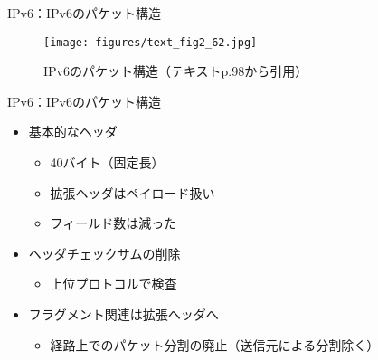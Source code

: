 \documentclass[12pt,aspectratio=169]{beamer}
\begin{document}
\begin{frame}{IPv6：IPv6のパケット構造}

  \centering
  \begin{figure}
    \centering
    \texttt{[image: figures/text\_fig2\_62.jpg]}
    \label{fig:text_fig2_62}
    \caption{IPv6のパケット構造（テキストp.98から引用）}
  \end{figure}

\end{frame}

\begin{frame}{IPv6：IPv6のパケット構造}

  \begin{itemize}
    \item 基本的なヘッダ
    \begin{itemize}
      \item 40バイト（固定長）
      \item 拡張ヘッダはペイロード扱い
      \item フィールド数は減った
    \end{itemize}
    \item ヘッダチェックサムの削除
    \begin{itemize}
      \item 上位プロトコルで検査
    \end{itemize}
    \item フラグメント関連は拡張ヘッダへ
    \begin{itemize}
      \item 経路上でのパケット分割の廃止（送信元による分割除く）
    \end{itemize}
  \end{itemize}

\end{frame}
\end{document}
